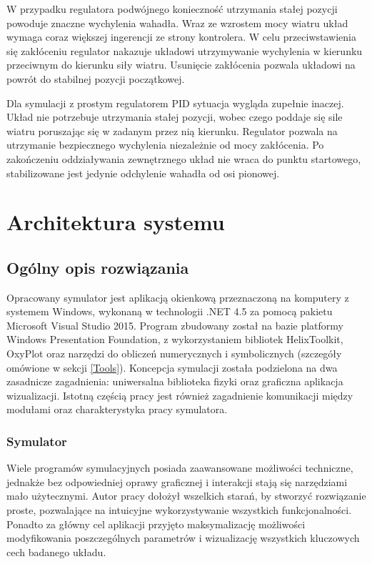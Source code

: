 \documentclass[12pt, twoside, openany]{report}
\theoremstyle{definition}
\begin{document}
W przypadku regulatora podwójnego konieczność utrzymania stałej pozycji powoduje znaczne wychylenia wahadła. Wraz ze wzrostem mocy wiatru układ wymaga coraz większej ingerencji ze strony kontrolera. W celu przeciwstawienia się zakłóceniu regulator nakazuje układowi utrzymywanie wychylenia w kierunku przeciwnym do kierunku siły wiatru. Usunięcie zakłócenia pozwala układowi na powrót do stabilnej pozycji początkowej. 

Dla symulacji z prostym regulatorem PID sytuacja wygląda zupełnie inaczej. Układ nie potrzebuje utrzymania stałej pozycji, wobec czego poddaje się sile wiatru poruszając się w zadanym przez nią kierunku. Regulator pozwala na utrzymanie bezpiecznego wychylenia niezależnie od mocy zakłócenia. Po zakończeniu oddziaływania zewnętrznego układ nie wraca do punktu startowego, stabilizowane jest jedynie odchylenie wahadła od osi pionowej.


\chapter{Architektura systemu}
\section{Ogólny opis rozwiązania}
Opracowany symulator jest aplikacją okienkową przeznaczoną na komputery z systemem Windows, wykonaną w technologii .NET 4.5 za pomocą pakietu Microsoft Visual Studio 2015. Program zbudowany został na bazie platformy Windows Presentation Foundation, z wykorzystaniem bibliotek HelixToolkit, OxyPlot oraz narzędzi do obliczeń numerycznych i symbolicznych (szczegóły omówione w sekcji \ref{Tools}). Koncepcja symulacji została podzielona na dwa zasadnicze zagadnienia: uniwersalna biblioteka fizyki oraz graficzna aplikacja wizualizacji. Istotną częścią pracy jest również zagadnienie komunikacji między modułami oraz charakterystyka pracy symulatora.

\subsection{Symulator}
Wiele programów symulacyjnych posiada zaawansowane możliwości techniczne, jednakże bez odpowiedniej oprawy graficznej i interakcji stają się narzędziami mało użytecznymi. Autor pracy dołożył wszelkich starań, by stworzyć rozwiązanie proste, pozwalające na intuicyjne wykorzystywanie wszystkich funkcjonalności. Ponadto za główny cel aplikacji przyjęto maksymalizację możliwości modyfikowania poszczególnych parametrów i wizualizację wszystkich kluczowych cech badanego układu. 
\end{document}
